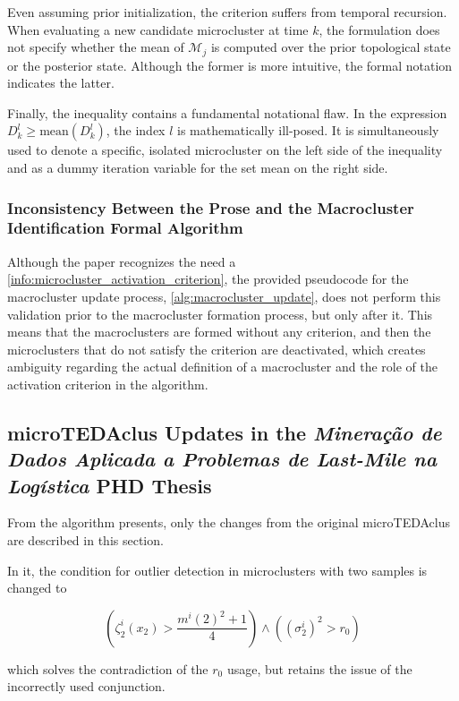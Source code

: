 \documentclass[a4paper]{article}
\begin{document}
Even assuming prior initialization, the criterion suffers from temporal recursion. When evaluating a new candidate microcluster at time $k$, the formulation does not specify whether the mean of $\mathcal{M}_j$ is computed over the prior topological state or the posterior state. Although the former is more intuitive, the formal notation indicates the latter.

Finally, the inequality contains a fundamental notational flaw. In the expression $D^l_k \ge \text{mean}\left(D^l_k\right)$, the index $l$ is mathematically ill-posed. It is simultaneously used to denote a specific, isolated microcluster on the left side of the inequality and as a dummy iteration variable for the set mean on the right side.

\subsubsection{Inconsistency Between the Prose and the Macrocluster Identification Formal Algorithm}

Although the paper recognizes the need a \ref{info:microcluster_activation_criterion}, the provided pseudocode for the macrocluster update process, \cref{alg:macrocluster_update}, does not perform this validation prior to the macrocluster formation process, but only after it. This means that the macroclusters are formed without any criterion, and then the microclusters that do not satisfy the criterion are deactivated, which creates ambiguity regarding the actual definition of a macrocluster and the role of the activation criterion in the algorithm.

\subsection{microTEDAclus Updates in the \textit{Mineração de Dados Aplicada a Problemas de Last-Mile na Logística} PHD Thesis}

From the algorithm \cite{galindo2021lastmile} presents, only the changes from the original microTEDAclus are described in this section.

In it, the condition for outlier detection in microclusters with two samples is changed to

\begin{equation}
    \left( \zeta^i_2(x_2)  > \frac{m^i(2)^2+1}{4} \right) \land \left( \left( \sigma^i_2 \right)^2 > r_0 \right)
\end{equation}

which solves the contradiction of the $r_0$ usage, but retains the issue of the incorrectly used conjunction.
\end{document}

